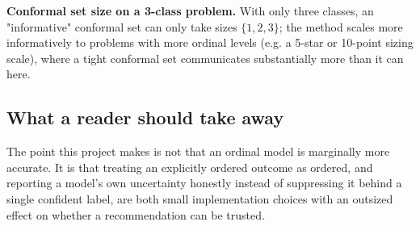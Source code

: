 \textbf{Conformal set size on a 3-class problem.} With only three classes,
an "informative" conformal set can only take sizes $\{1, 2, 3\}$; the method
scales more informatively to problems with more ordinal levels (e.g. a 5-star
or 10-point sizing scale), where a tight conformal set communicates
substantially more than it can here.

\subsection{What a reader should take away}

The point this project makes is not that an ordinal model is marginally more
accurate. It is that treating an explicitly ordered outcome as ordered, and
reporting a model's own uncertainty honestly instead of suppressing it behind
a single confident label, are both small implementation choices with an
outsized effect on whether a recommendation can be trusted.

